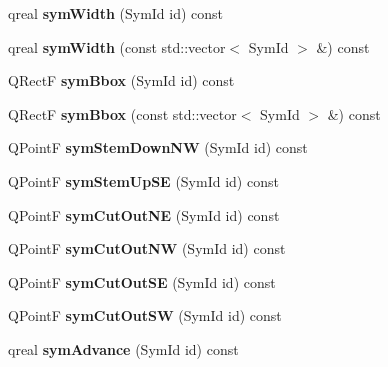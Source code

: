 \begin{DoxyCompactItemize}
qreal {\bfseries sym\+Width} (Sym\+Id id) const
\item 
\mbox{\label{class_ms_1_1_element_a175d0a2254d83ee5f486123cb3ea2612}} 
qreal {\bfseries sym\+Width} (const std\+::vector$<$ Sym\+Id $>$ \&) const
\item 
\mbox{\label{class_ms_1_1_element_a70a8140969dcd988ed77e91c27b6a84f}} 
Q\+RectF {\bfseries sym\+Bbox} (Sym\+Id id) const
\item 
\mbox{\label{class_ms_1_1_element_adad5f2c7a943687f0b3de2e896942898}} 
Q\+RectF {\bfseries sym\+Bbox} (const std\+::vector$<$ Sym\+Id $>$ \&) const
\item 
\mbox{\label{class_ms_1_1_element_a7c49ac344dd76c56fd51dad4287b79d5}} 
Q\+PointF {\bfseries sym\+Stem\+Down\+NW} (Sym\+Id id) const
\item 
\mbox{\label{class_ms_1_1_element_a2526cc958a514c74daebfcdcc2dae7dc}} 
Q\+PointF {\bfseries sym\+Stem\+Up\+SE} (Sym\+Id id) const
\item 
\mbox{\label{class_ms_1_1_element_a984c5f0381896ac71fcf054d056bbe66}} 
Q\+PointF {\bfseries sym\+Cut\+Out\+NE} (Sym\+Id id) const
\item 
\mbox{\label{class_ms_1_1_element_a545d8382d25c1402b0e46974ce84d444}} 
Q\+PointF {\bfseries sym\+Cut\+Out\+NW} (Sym\+Id id) const
\item 
\mbox{\label{class_ms_1_1_element_af0b900ab6bb2674c1dcad1c5100fb4ee}} 
Q\+PointF {\bfseries sym\+Cut\+Out\+SE} (Sym\+Id id) const
\item 
\mbox{\label{class_ms_1_1_element_a0cb9e0cf90c74e5b718e10f8a9a796da}} 
Q\+PointF {\bfseries sym\+Cut\+Out\+SW} (Sym\+Id id) const
\item 
\mbox{\label{class_ms_1_1_element_a1625813b59654991c24a9a10eb580f07}} 
qreal {\bfseries sym\+Advance} (Sym\+Id id) const
\item 
\mbox{\label{class_ms_1_1_element_afb8e6c4666375224388e616251fc2de3}} 

\end{DoxyCompactItemize}
